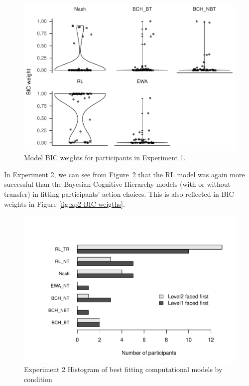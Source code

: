 \documentclass[man,floatsintext]{apa6}
\begin{document}
\begin{figure}

{\centering \includegraphics{paper_draft_2021_files/figure-latex/xp1-BIC-weigths-1} 

}

\caption{Model BIC weights for participants in Experiment 1.}\label{fig:xp1-BIC-weigths}
\end{figure}

In Experiment 2, we can see from Figure~\ref{fig:exp2-comp-models} that the RL model was again more successful than the Bayesian Cognitive Hierarchy models (with or without transfer) in fitting participants' action choices. This is also reflected in BIC weights in Figure \ref{fig:xp2-BIC-weigths}.

\begin{figure}

{\centering \includegraphics[width=\textwidth]{paper_draft_2021_files/figure-latex/exp2-comp-models-1} 

}

\caption{Experiment 2 Histogram of best fitting computational models by condition}\label{fig:exp2-comp-models}
\end{figure}
\end{document}

